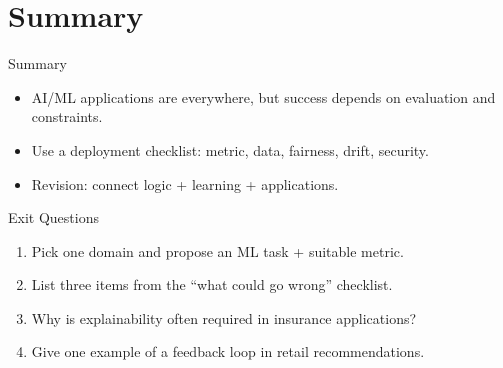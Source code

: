 \documentclass[aspectratio=169]{beamer}
\begin{document}
\section{Summary}
\label{sec:summary}

\begin{frame}{Summary}
  \begin{itemize}
    \item AI/ML applications are everywhere, but success depends on evaluation and constraints.
    \item Use a deployment checklist: metric, data, fairness, drift, security.
    \item Revision: connect logic + learning + applications.
  \end{itemize}
  \slidesources{\AIMLUnitVSources}
\end{frame}

\begin{frame}{Exit Questions}
  \begin{enumerate}
    \item Pick one domain and propose an ML task + suitable metric.
    \item List three items from the ``what could go wrong'' checklist.
    \item Why is explainability often required in insurance applications?
    \item Give one example of a feedback loop in retail recommendations.
  \end{enumerate}
\end{frame}
\end{document}
